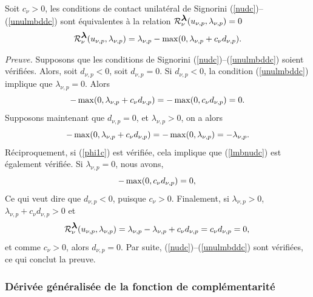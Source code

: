 \begin{proposition}\label{prop1}
Soit $c_\nu>0$, les conditions de contact unilatéral de Signorini (\ref{nudc})--(\ref{unulmbddc}) sont équivalentes à la relation ${\cal R}_{\nu}^{\mbox{\boldmath{$\lambda$}}}(u_{\nu, p},\lambda_{\nu, p})=0$
\begin{align*}\label{phi1c}
{\cal R}_{\nu}^{\mbox{\boldmath{$\lambda$}}}(u_{\nu, p},\lambda_{\nu, p})=\lambda_{\nu, p}-\max(0,\lambda_{\nu, p}+c_{\nu}d_{\nu,p}).
\end{align*}
\end{proposition}
\noindent
\textit{Preuve.} Supposons que les conditions de Signorini (\ref{nudc})--(\ref{unulmbddc}) soient vérifiées. Alors, soit $d_{\nu,p} < 0$, soit $d_{\nu,p} = 0$. Si $d_{\nu,p} < 0$, la condition (\ref{unulmbddc}) implique que $\lambda_{\nu, p} = 0$. Alors\\
\begin{equation*}
-\max(0,\lambda_{\nu, p}+c_{\nu}d_{\nu,p}) = -\max(0,c_{\nu}d_{\nu,p}) = 0.\\
\end{equation*}
\noindent
Supposons maintenant que $d_{\nu,p} = 0$, et $\lambda_{\nu, p} > 0$, on a alors\\
\begin{equation*}
-\max(0,\lambda_{\nu, p}+c_{\nu}d_{\nu,p}) = -\max(0,\lambda_{\nu, p}) = -\lambda_{\nu, p}.\\
\end{equation*}
Réciproquement, si (\ref{phi1c}) est vérifiée, cela implique que 
(\ref{lmbnudc}) est également vérifiée. Si $\lambda_{\nu, p} = 0$, nous avons,\\
\begin{equation*}
-\max(0,c_{\nu}d_{\nu,p}) = 0,\\
\end{equation*}
\noindent
Ce qui veut dire que $d_{\nu,p} < 0$, puisque $c_{\nu} > 0$. Finalement, si $\lambda_{\nu, p} > 0$,\\ $\lambda_{\nu, p}+c_{\nu}d_{\nu,p} > 0$ et\\
\begin{equation*}
{\cal R}_{\nu}^{\mbox{\boldmath{$\lambda$}}}(u_{\nu, p},\lambda_{\nu, p})=\lambda_{\nu, p}-\lambda_{\nu, p}+c_{\nu}d_{\nu,p} = c_{\nu}d_{\nu,p} = 0,\\
\end{equation*}
\noindent
et comme $c_{\nu} > 0$, alors $d_{\nu,p} = 0$. Par suite, (\ref{nudc})--(\ref{unulmbddc}) sont vérifiées, ce qui conclut la preuve.

\subsubsection{Dérivée généralisée de la fonction de complémentarité}\label{gen_deriv}


